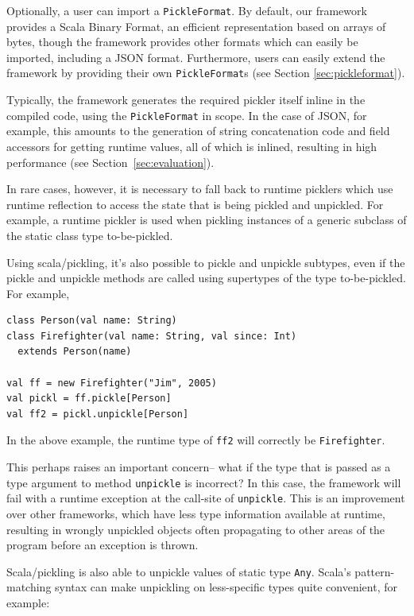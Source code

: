 \documentclass[preprint,10pt]{sigplanconf}
\theoremstyle{definition}
\theoremstyle{definition}
\newcommand{\term}[1]{\mbox{\texttt{#1}}}
\begin{document}
Optionally, a user can
import a \term{PickleFormat}. By default, our framework provides a
Scala Binary Format, an efficient representation based on arrays of bytes,
though the framework provides other formats which can easily be imported,
including a JSON format. Furthermore, users can easily extend the framework by
providing their own \term{PickleFormat}s (see Section \ref{sec:pickleformat}).

Typically, the framework generates the required pickler itself inline in the
compiled code, using the \term{PickleFormat} in scope. In the case of JSON,
for example, this amounts to the generation of string concatenation code and
field accessors for getting runtime values, all of which is inlined, resulting
in high performance (see Section~\ref{sec:evaluation}).

In rare cases, however, it is necessary to fall back to runtime picklers which
use runtime reflection to access the state that is being pickled and
unpickled. For example, a runtime pickler is used when pickling instances of a
generic subclass of the static class type to-be-pickled.

Using scala/pickling, it's
also possible to pickle and unpickle subtypes, even if the pickle and unpickle
methods are called using supertypes of the type to-be-pickled.
For example,

\begin{lstlisting}
class Person(val name: String)
class Firefighter(val name: String, val since: Int)
  extends Person(name)

val ff = new Firefighter("Jim", 2005)
val pickl = ff.pickle[Person]
val ff2 = pickl.unpickle[Person]
\end{lstlisting}

In the above example, the runtime type of \term{ff2} will correctly be
\term{Firefighter}.

This perhaps raises an important concern-- what if the type that is passed as
a type argument to method \term{unpickle} is incorrect? In this case, the
framework will fail with a runtime exception at the call-site of
\term{unpickle}. This is an improvement over other frameworks, which have less
type information available at runtime, resulting in wrongly unpickled objects
often propagating to other areas of the program before an exception is thrown.

Scala/pickling is also able to unpickle values of static type
\term{Any}. Scala's pattern-matching syntax can make unpickling on less-specific
types quite convenient, for example:
\end{document}
